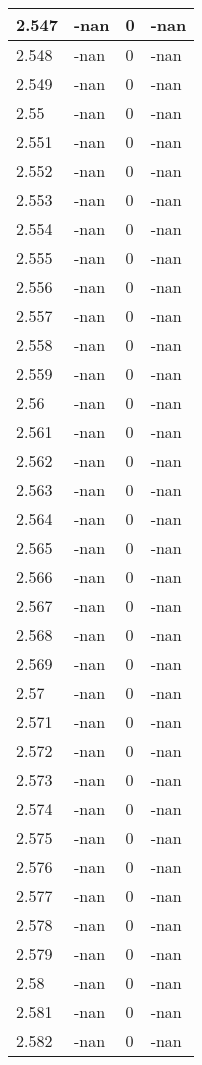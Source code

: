 \documentclass[a4paper,14pt]{extarticle}
\begin{document}
\begin{longtable}{||m{3cm}||m{3cm}|m{3cm}||m{3cm}||}
\hline
2.547 & -nan & 0 & -nan\\
\hline
2.548 & -nan & 0 & -nan\\
\hline
2.549 & -nan & 0 & -nan\\
\hline
2.55 & -nan & 0 & -nan\\
\hline
2.551 & -nan & 0 & -nan\\
\hline
2.552 & -nan & 0 & -nan\\
\hline
2.553 & -nan & 0 & -nan\\
\hline
2.554 & -nan & 0 & -nan\\
\hline
2.555 & -nan & 0 & -nan\\
\hline
2.556 & -nan & 0 & -nan\\
\hline
2.557 & -nan & 0 & -nan\\
\hline
2.558 & -nan & 0 & -nan\\
\hline
2.559 & -nan & 0 & -nan\\
\hline
2.56 & -nan & 0 & -nan\\
\hline
2.561 & -nan & 0 & -nan\\
\hline
2.562 & -nan & 0 & -nan\\
\hline
2.563 & -nan & 0 & -nan\\
\hline
2.564 & -nan & 0 & -nan\\
\hline
2.565 & -nan & 0 & -nan\\
\hline
2.566 & -nan & 0 & -nan\\
\hline
2.567 & -nan & 0 & -nan\\
\hline
2.568 & -nan & 0 & -nan\\
\hline
2.569 & -nan & 0 & -nan\\
\hline
2.57 & -nan & 0 & -nan\\
\hline
2.571 & -nan & 0 & -nan\\
\hline
2.572 & -nan & 0 & -nan\\
\hline
2.573 & -nan & 0 & -nan\\
\hline
2.574 & -nan & 0 & -nan\\
\hline
2.575 & -nan & 0 & -nan\\
\hline
2.576 & -nan & 0 & -nan\\
\hline
2.577 & -nan & 0 & -nan\\
\hline
2.578 & -nan & 0 & -nan\\
\hline
2.579 & -nan & 0 & -nan\\
\hline
2.58 & -nan & 0 & -nan\\
\hline
2.581 & -nan & 0 & -nan\\
\hline
2.582 & -nan & 0 & -nan\\

\end{longtable}
\end{document}
